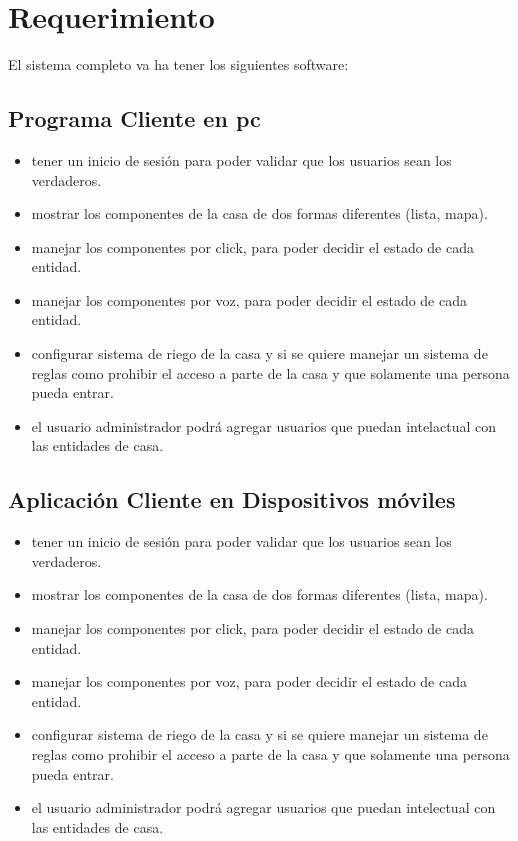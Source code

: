 \section{Requerimiento}
El sistema completo va ha tener los siguientes software:

\subsection{Programa Cliente en pc}
\begin{itemize}
\item tener un inicio de sesión para poder validar que los usuarios sean los verdaderos.
\item mostrar los componentes de la casa de dos formas diferentes (lista, mapa).
\item manejar los componentes por click, para poder decidir el estado de cada entidad.
\item manejar los componentes por voz, para poder decidir el estado de cada entidad.
\item configurar sistema de riego de la casa y si se quiere manejar un sistema de reglas como prohibir el acceso a parte de la casa y que solamente una persona pueda entrar.
\item el usuario administrador podrá agregar usuarios que puedan intelactual con las entidades de casa.
\end{itemize}
\subsection{Aplicación Cliente en Dispositivos móviles}
\begin{itemize}
\item tener un inicio de sesión para poder validar que los usuarios sean los verdaderos.
\item mostrar los componentes de la casa de dos formas diferentes (lista, mapa).
\item manejar los componentes por click, para poder decidir el estado de cada entidad.
\item manejar los componentes por voz, para poder decidir el estado de cada entidad.
\item configurar sistema de riego de la casa y si se quiere manejar un sistema de reglas como prohibir el acceso a parte de la casa y que solamente una persona pueda entrar.
\item el usuario administrador podrá agregar usuarios que puedan intelectual con las entidades de casa.
\end{itemize}
